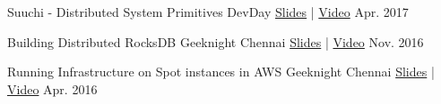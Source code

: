 



\begin{cvhonors}

  \cvhonor
    {Suuchi - Distributed System Primitives} %
    {DevDay} %
    {\href{https://speakerdeck.com/ashwanthkumar/suuchi-distributed-system-primitives}{Slides} | \href{https://www.youtube.com/watch?v=0pW6tAM8rIQ}{Video}} %
    {Apr. 2017} %

  \cvhonor
    {Building Distributed RocksDB} %
    {Geeknight Chennai} %
    {\href{http://bit.ly/distributed-rocksdb}{Slides} | \href{https://www.youtube.com/watch?v=PSCa9_Avne0}{Video}} %
    {Nov. 2016} %

  \cvhonor
    {Running Infrastructure on Spot instances in AWS} %
    {Geeknight Chennai} %
    {\href{http://j.mp/to-matsya-geeknight}{Slides} | \href{https://www.youtube.com/watch?v=qeBV9JRoTOA}{Video}} %
    {Apr. 2016} %

\end{cvhonors}


